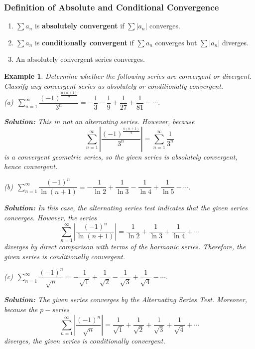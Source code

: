 \documentclass[titlepage,a4paper,12pt]{report}
\newtheorem{example}{Example}[section]
\begin{document}
\subsubsection{Definition of Absolute and Conditional Convergence}
\begin{enumerate}
\item $\displaystyle \sum a_n$ is \textbf{absolutely convergent} if $\displaystyle \sum |a_n|$ converges.
\item $\displaystyle \sum a_n$ is \textbf{conditionally convergent } if $\displaystyle \sum a_n$ converges but $\displaystyle \sum |a_n|$ diverges.
\item An absolutely convergent series converges.
\end{enumerate}
\begin{example}
Determine whether the following series are convergent or divergent. Classify any convergent  series as absolutely or conditionally convergent.\\
(a)\, $\displaystyle \sum _{n=1}^\infty \dfrac{(-1)^{\frac{n(n+1)}{2}}}{3^n}=-\dfrac{1}{3}-\dfrac{1}{9}+\dfrac{1}{27}+\dfrac{1}{81}-\cdots$.

\noindent \textbf{Solution:} This in not an alternating series. However, because
\[\sum _{n=1}^\infty \left |\dfrac{(-1)^{\frac{n(n+1)}{2}}}{3^n}\right|=\sum _{n=1}^\infty \dfrac{1}{3^n}\] is a convergent geometric series, so the given series is absolutely convergent, hence convergent.

\noindent (b)\, $\displaystyle \sum _{n=1}^\infty \dfrac{(-1)^n}{\ln (n+1)}=-\dfrac{1}{\ln 2}+\dfrac{1}{\ln 3}-\dfrac{1}{\ln 4}+\dfrac{1}{\ln 5}-\cdots$.

\noindent \textbf{Solution:} In this case, the alternating series test indicates that the given series converges. However, the series 
\[\sum _{n=1}^\infty \left|\dfrac{(-1)^n}{\ln (n+1)}\right|=\dfrac{1}{\ln 2}+\dfrac{1}{\ln 3}+\dfrac{1}{\ln 4}+\cdots\] diverges by direct comparison with terms of the harmonic series. Therefore, the given series is conditionally convergent.

\noindent (c)\, $\displaystyle \sum _{n=1}^\infty \dfrac{(-1)^n}{\sqrt{n}}=-\dfrac{1}{\sqrt{1}}+\dfrac{1}{\sqrt{2}}-\dfrac{1}{\sqrt{3}}+\dfrac{1}{\sqrt{4}}-\cdots$.

\noindent \textbf{Solution:} The given series converges by the Alternating Series Test. Moreover, because the $p-$series 
\[\sum _{n=1}^\infty \left|\dfrac{(-1)^n}{\sqrt{n}}\right|=\dfrac{1}{\sqrt{1}}+\dfrac{1}{\sqrt{2}}+\dfrac{1}{\sqrt{3}}+\dfrac{1}{\sqrt{4}}+\cdots\] diverges, the given series is conditionally convergent.
\end{example}
\end{document}
